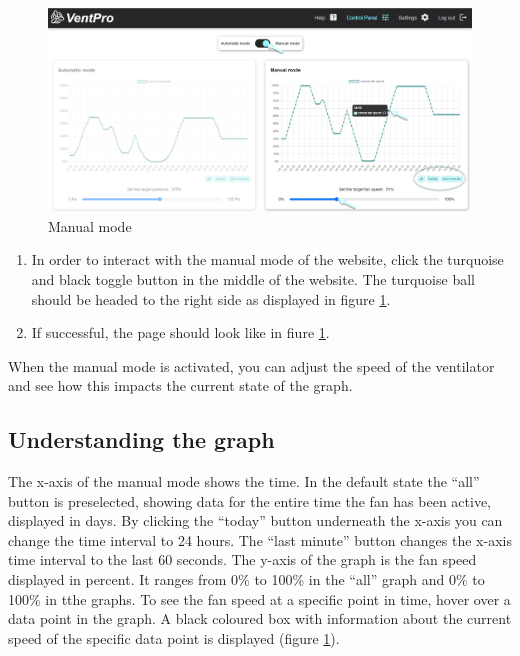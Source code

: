 \begin{figure}[h]
\centering
\includegraphics[width=1.0\textwidth]{img/Picture5}
\caption{Manual mode}
\label{fig:picture_5}
\end{figure}
\vspace{0.3cm}

\begin{enumerate}[wide,  labelwidth=0.3cm,  labelindent=0pt, leftmargin=0.5cm]
\item In order to interact with the manual mode of the website, click the turquoise and black toggle button in the middle of the website. The turquoise ball should be headed to the right side as displayed in figure \ref{fig:picture_5}.
\item If successful, the page should look like in fiure \ref{fig:picture_5}.
\end{enumerate}

When the manual mode is activated, you can adjust the speed of the ventilator and see how this
impacts the current state of the graph.

\subsection*{Understanding the graph}

The x-axis of the manual mode shows the time. In the default state the “all” button is preselected, showing data for the entire time the fan has been active, displayed in days. By clicking the “today” button underneath the x-axis you can change the time interval to 24 hours. The “last minute” button changes the x-axis time interval to the last 60 seconds. The y-axis of the graph is the fan speed displayed in percent. It ranges from 0\% to 100\% in the “all” graph and 0\% to 100\% in tthe graphs. To see the fan speed at a specific point in time, hover over a data point in the graph. A black coloured box with information about the current speed of the specific data point is displayed (figure \ref{fig:picture_5}).

